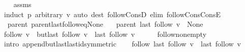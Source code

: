 \begin{isabellebody}
\endisataginvisible
{\isafoldinvisible}%
%
\isadeliminvisible
\isanewline
%
\endisadeliminvisible
%
\isadelimproof
\ \ %
\endisadelimproof
%
\isatagproof
{}\isamarkupfalse%
\ assms\isanewline
\ \ \isamarkupfalse%
\ {\isacharparenleft}{\kern0pt}induct\ p\ arbitrary{\isacharcolon}{\kern0pt}\ v{\isacharparenright}{\kern0pt}\ {\isacharparenleft}{\kern0pt}auto\ dest{\isacharcolon}{\kern0pt}\ follow{\isacharunderscore}{\kern0pt}ConsD\ elim{\isacharcolon}{\kern0pt}\ follow{\isacharunderscore}{\kern0pt}Cons{\isacharunderscore}{\kern0pt}ConsE{\isacharparenright}{\kern0pt}%
\endisatagproof
{\isafoldproof}%
%
\isadelimproof
\isanewline
%
\endisadelimproof
%
\isadeliminvisible
\isanewline
%
\endisadeliminvisible
%
\isataginvisible
{}\isamarkupfalse%
\ {\isacharparenleft}{\kern0pt}\ parent{\isacharparenright}{\kern0pt}\ parent{\isacharunderscore}{\kern0pt}last{\isacharunderscore}{\kern0pt}follow{\isacharunderscore}{\kern0pt}eq{\isacharunderscore}{\kern0pt}None{\isacharcolon}{\kern0pt}\isanewline
\ \ \ {\isachardoublequoteopen}parent\ {\isacharparenleft}{\kern0pt}last\ {\isacharparenleft}{\kern0pt}follow\ v{\isacharparenright}{\kern0pt}{\isacharparenright}{\kern0pt}\ {\isacharequal}{\kern0pt}\ None{\isachardoublequoteclose}%
\endisataginvisible
{\isafoldinvisible}%
%
\isadeliminvisible
\isanewline
%
\endisadeliminvisible
%
\isadelimproof
%
\endisadelimproof
%
\isatagproof
{}\isamarkupfalse%
\ {\isacharminus}{\kern0pt}\isanewline
\ \ \isamarkupfalse%
\ {\isachardoublequoteopen}follow\ v\ {\isacharequal}{\kern0pt}\ butlast\ {\isacharparenleft}{\kern0pt}follow\ v{\isacharparenright}{\kern0pt}\ {\isacharat}{\kern0pt}\ {\isacharbrackleft}{\kern0pt}last\ {\isacharparenleft}{\kern0pt}follow\ v{\isacharparenright}{\kern0pt}{\isacharbrackright}{\kern0pt}{\isachardoublequoteclose}\isanewline
\ \ \ \ \isamarkupfalse%
\ follow{\isacharunderscore}{\kern0pt}non{\isacharunderscore}{\kern0pt}empty\isanewline
\ \ \ \ \isamarkupfalse%
\ {\isacharparenleft}{\kern0pt}intro\ append{\isacharunderscore}{\kern0pt}butlast{\isacharunderscore}{\kern0pt}last{\isacharunderscore}{\kern0pt}id{\isacharbrackleft}{\kern0pt}symmetric{\isacharbrackright}{\kern0pt}{\isacharparenright}{\kern0pt}\isanewline
\ \ \isamarkupfalse%
\ {\isachardoublequoteopen}follow\ {\isacharparenleft}{\kern0pt}last\ {\isacharparenleft}{\kern0pt}follow\ v{\isacharparenright}{\kern0pt}{\isacharparenright}{\kern0pt}\ {\isacharequal}{\kern0pt}\ {\isacharbrackleft}{\kern0pt}last\ {\isacharparenleft}{\kern0pt}follow\ v{\isacharparenright}{\kern0pt}{\isacharbrackright}{\kern0pt}{\isachardoublequoteclose}\isanewline

\end{isabellebody}
